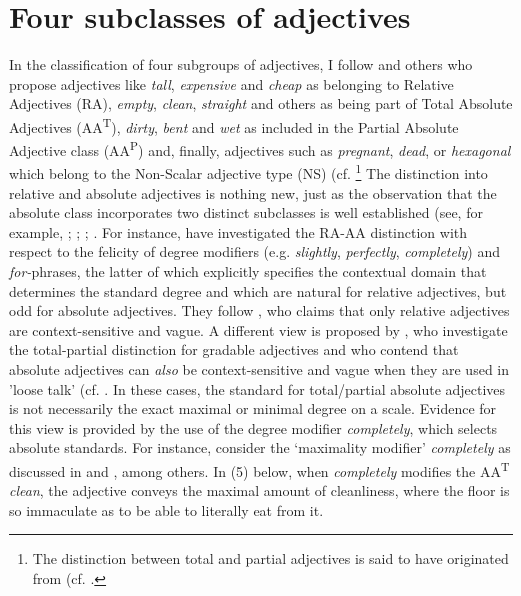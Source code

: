 \documentclass[output=paper
,modfonts
,nonflat]{langsci/langscibook}
\begin{document}
\section{Four subclasses of adjectives}
\label{sec:four-adj}
In the classification of four subgroups of adjectives, I follow \citet{Burnett2017} and others who propose adjectives like \textit{tall}, \textit{expensive} and \textit{cheap} as belonging to Relative Adjectives (RA), \textit{empty}, \textit{clean}, \textit{straight} and others as being part of Total Absolute Adjectives (AA\textsuperscript{T}), \textit{dirty}, \textit{bent} and \textit{wet} as included in the Partial Absolute Adjective class (AA\textsuperscript{P}) and, finally, adjectives such as \textit{pregnant}, \textit{dead}, or \textit{hexagonal} which belong to the Non-Scalar adjective type (NS) (cf. \textcite[4]{Burnett2017} \footnote{The distinction between total and partial adjectives is said to have originated from \citet{Yoon1996} (cf. \textcite*[355]{Kennedy2005}.} The distinction into relative and absolute adjectives is nothing new, just as the observation that the absolute class incorporates two distinct subclasses is well established (see, for example, \citet*{Rotstein2004}; \citet*{ Kennedy2005}; \citet*{Kennedy2007}; \citet{Toledo2011}. For instance, \citet{Kennedy2005} have investigated the RA-AA distinction with respect to the felicity of degree modifiers (e.g. \textit{slightly},  \textit{perfectly},  \textit{completely}) and \textit{for-}phrases, the latter of which explicitly specifies the contextual domain that determines the standard degree and which are natural for relative adjectives, but odd for absolute adjectives. They follow \citet{Unger1975}, who claims that only relative adjectives are context-sensitive and vague.
A different view is proposed by \citet*{Rotstein2004}, who investigate the total-partial distinction for gradable adjectives and who contend that absolute adjectives can \textit{also} be context-sensitive and vague when they are used in 'loose talk' (cf. \citet{Lewis1979}. In these cases, the standard for total/partial absolute adjectives is not necessarily the exact maximal or minimal degree on a scale. Evidence for this view is provided by the use of the degree modifier \textit{completely}, which selects absolute standards. For instance, consider the `maximality modifier' \textit{completely} as discussed in \citet{Kennedy2005} and \cite*{Rotstein2004}, among others. In (5) below, when \textit{completely} modifies the AA\textsuperscript{T} \textit{clean}, the adjective conveys the maximal amount of cleanliness, where the floor is so immaculate as to be able to literally eat from it. 
\end{document}
